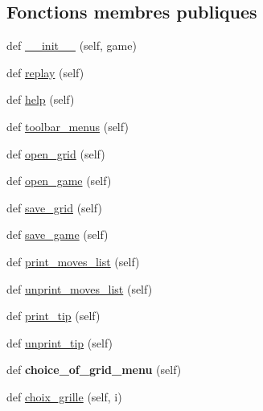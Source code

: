 \subsection*{Fonctions membres publiques}
\begin{DoxyCompactItemize}
\item 
def \hyperlink{classmain_1_1MainWindow_a1a032331db3e5bbe3267696548ae95df}{\+\_\+\+\_\+init\+\_\+\+\_\+} (self, game)
\item 
def \hyperlink{classmain_1_1MainWindow_ad778ae6b83bc497287aa2f86907a4615}{replay} (self)
\item 
def \hyperlink{classmain_1_1MainWindow_afd6674a5ffab5505719cf020fd430ce0}{help} (self)
\item 
def \hyperlink{classmain_1_1MainWindow_a521027a76aa1c1a13e897137ad43c7d9}{toolbar\+\_\+menus} (self)
\item 
def \hyperlink{classmain_1_1MainWindow_a960159ca187e8bb3a2a53a6ba312331c}{open\+\_\+grid} (self)
\item 
def \hyperlink{classmain_1_1MainWindow_a841e6a28b64e63e03be4fd0073a38ce4}{open\+\_\+game} (self)
\item 
def \hyperlink{classmain_1_1MainWindow_a558ce5d5b1925ec43d49e7acdf5af822}{save\+\_\+grid} (self)
\item 
def \hyperlink{classmain_1_1MainWindow_a208742a5aac99355ae19aee19e9f6419}{save\+\_\+game} (self)
\item 
def \hyperlink{classmain_1_1MainWindow_ad908d5e23984194a3d4dd878489931c4}{print\+\_\+moves\+\_\+list} (self)
\item 
def \hyperlink{classmain_1_1MainWindow_a8c46b65de1e73cd947c826d02d31af4c}{unprint\+\_\+moves\+\_\+list} (self)
\item 
def \hyperlink{classmain_1_1MainWindow_aa7696020f657685831fd5aa212c28e34}{print\+\_\+tip} (self)
\item 
def \hyperlink{classmain_1_1MainWindow_a5ef7f82048e9f0fc50b1f0e1662c9e79}{unprint\+\_\+tip} (self)
\item 
\mbox{\label{classmain_1_1MainWindow_a92b541a5faac6214fb37270d19f50038}} 
def {\bfseries choice\+\_\+of\+\_\+grid\+\_\+menu} (self)
\item 
def \hyperlink{classmain_1_1MainWindow_a58e160cf36543e63aa78558a54e9fea1}{choix\+\_\+grille} (self, i)
\item 
\mbox{\label{classmain_1_1MainWindow_ac496b3996d4a5bc369742de428f9376b}} 

\end{DoxyCompactItemize}
